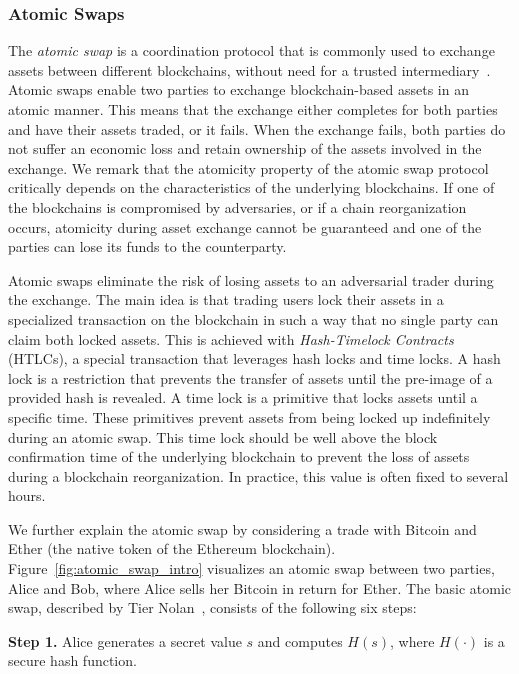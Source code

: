\subsubsection{Atomic Swaps}
The \emph{atomic swap} is a coordination protocol that is commonly used to exchange assets between different blockchains, without need for a trusted intermediary~\cite{herlihy2018atomic}.
Atomic swaps enable two parties to exchange blockchain-based assets in an atomic manner.
This means that the exchange either completes for both parties and have their assets traded, or it fails.
When the exchange fails, both parties do not suffer an economic loss and retain ownership of the assets involved in the exchange.
We remark that the atomicity property of the atomic swap protocol critically depends on the characteristics of the underlying blockchains.
If one of the blockchains is compromised by adversaries, or if a chain reorganization occurs, atomicity during asset exchange cannot be guaranteed and one of the parties can lose its funds to the counterparty.

Atomic swaps eliminate the risk of losing assets to an adversarial trader during the exchange.
The main idea is that trading users lock their assets in a specialized transaction on the blockchain in such a way that no single party can claim both locked assets.
This is achieved with \emph{Hash-Timelock Contracts} (HTLCs), a special transaction that leverages hash locks and time locks.
A hash lock is a restriction that prevents the transfer of assets until the pre-image of a provided hash is revealed.
A time lock is a primitive that locks assets until a specific time.
These primitives prevent assets from being locked up indefinitely during an atomic swap.
This time lock should be well above the block confirmation time of the underlying blockchain to prevent the loss of assets during a blockchain reorganization.
In practice, this value is often fixed to several hours.

We further explain the atomic swap by considering a trade with Bitcoin and Ether (the native token of the Ethereum blockchain).
Figure~\ref{fig:atomic_swap_intro} visualizes an atomic swap between two parties, Alice and Bob, where Alice sells her Bitcoin in return for Ether.
The basic atomic swap, described by Tier Nolan~\cite{nolan2016atomic}, consists of the following six steps:

\textbf{Step 1.} Alice generates a secret value $ s $ and computes $ H(s) $, where $ H(\cdot) $ is a secure hash function.

